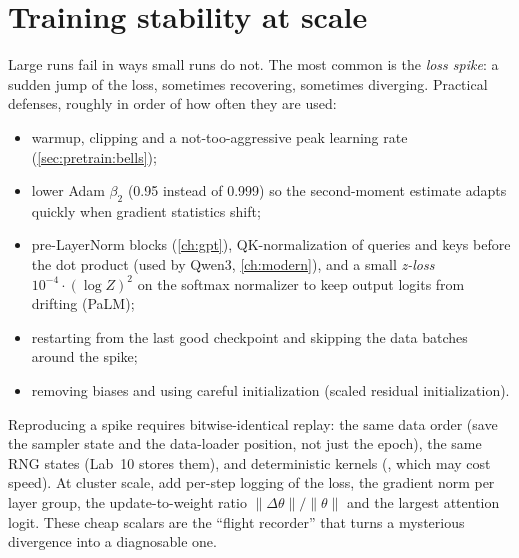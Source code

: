 \section{Training stability at scale}\label{sec:pretrain:stability}

Large runs fail in ways small runs do not. The most common is the \emph{loss spike}: a sudden
jump of the loss, sometimes recovering, sometimes diverging. Practical defenses, roughly in
order of how often they are used:
\begin{itemize}
\item warmup, clipping and a not-too-aggressive peak learning rate (\cref{sec:pretrain:bells});
\item lower Adam $\beta_2$ (0.95 instead of 0.999) so the second-moment estimate adapts quickly
  when gradient statistics shift;
\item pre-LayerNorm blocks (\cref{ch:gpt}), QK-normalization of queries and keys before the dot
  product (used by Qwen3, \cref{ch:modern}), and a small \emph{z-loss} $10^{-4}\cdot(\log Z)^2$ on
  the softmax normalizer to keep output logits from drifting (PaLM);
\item restarting from the last good checkpoint and skipping the data batches around the spike;
\item removing biases and using careful initialization (scaled residual initialization).
\end{itemize}

\begin{systemslens}
Reproducing a spike requires bitwise-identical replay: the same data order (save the sampler
state and the data-loader position, not just the epoch), the same RNG states (Lab~10 stores
them), and deterministic kernels (, which may
cost speed). At cluster scale, add per-step logging of the loss, the gradient norm per layer
group, the update-to-weight ratio $\|\Delta\theta\|/\|\theta\|$ and the largest attention logit.
These cheap scalars are the ``flight recorder'' that turns a mysterious divergence into a
diagnosable one.
\end{systemslens}

